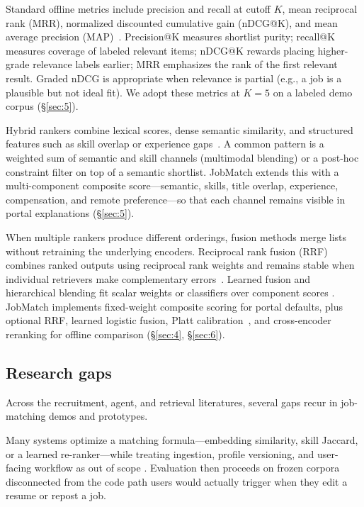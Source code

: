 Standard offline metrics include precision and recall at cutoff $K$, mean reciprocal rank (MRR), normalized discounted cumulative gain (nDCG@K), and mean average precision (MAP)~\cite{Manning2008}.
Precision@K measures shortlist purity; recall@K measures coverage of labeled relevant items; nDCG@K rewards placing higher-grade relevance labels earlier; MRR emphasizes the rank of the first relevant result.
Graded nDCG is appropriate when relevance is partial (e.g., a job is a plausible but not ideal fit).
We adopt these metrics at $K{=}5$ on a labeled demo corpus (\S\ref{sec:5}).

Hybrid rankers combine lexical scores, dense semantic similarity, and structured features such as skill overlap or experience gaps~\cite{Manning2008,Robertson2009,Reimers2019}.
A common pattern is a weighted sum of semantic and skill channels (multimodal blending) or a post-hoc constraint filter on top of a semantic shortlist.
JobMatch extends this with a multi-component composite score---semantic, skills, title overlap, experience, compensation, and remote preference---so that each channel remains visible in portal explanations (\S\ref{sec:5}).

When multiple rankers produce different orderings, fusion methods merge lists without retraining the underlying encoders.
Reciprocal rank fusion (RRF) combines ranked outputs using reciprocal rank weights and remains stable when individual retrievers make complementary errors~\cite{Cormack2009}.
Learned fusion and hierarchical blending fit scalar weights or classifiers over component scores .
JobMatch implements fixed-weight composite scoring for portal defaults, plus optional RRF, learned logistic fusion, Platt calibration~\cite{Platt1999}, and cross-encoder reranking for offline comparison (\S\ref{sec:4}, \S\ref{sec:6}).

\subsection{Research gaps}\label{sec:2-gaps}

Across the recruitment, agent, and retrieval literatures, several gaps recur in job-matching demos and prototypes.

Many systems optimize a matching formula---embedding similarity, skill Jaccard, or a learned re-ranker---while treating ingestion, profile versioning, and user-facing workflow as out of scope .
Evaluation then proceeds on frozen corpora disconnected from the code path users would actually trigger when they edit a resume or repost a job.

